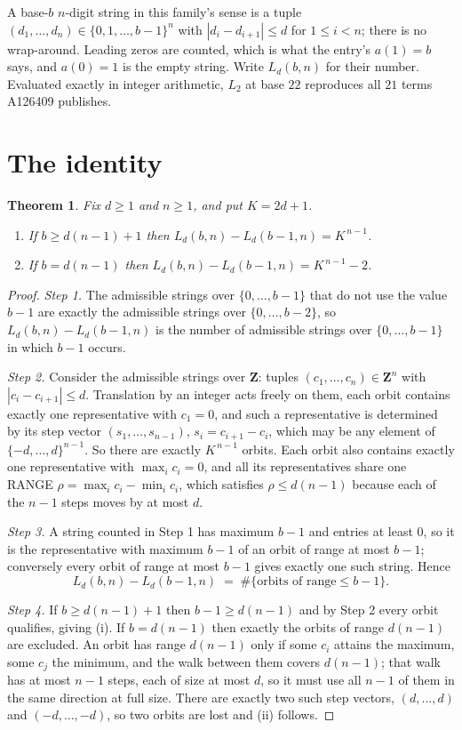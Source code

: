 \documentclass[11pt,a4paper]{article}
\theoremstyle{plain}
\newtheorem{theorem}{Theorem}
\theoremstyle{definition}
\begin{document}
A base-$b$ $n$-digit string in this family's sense is a tuple
$(d_1,\dots,d_n)\in\{0,1,\dots,b-1\}^{n}$ with $|d_i-d_{i+1}|\le d$ for $1\le i<n$; there
is no wrap-around. Leading zeros are counted, which is what the entry's $a(1)=b$ says, and
$a(0)=1$ is the empty string. Write $L_d(b,n)$ for their number. Evaluated exactly in integer
arithmetic, $L_{2}$ at base $22$ reproduces all $21$ terms A126409 publishes.

\section{The identity}

\begin{theorem}
Fix $d\ge1$ and $n\ge1$, and put $K=2d+1$.
\begin{enumerate}
\item[(i)] If $b\ge d(n-1)+1$ then $L_d(b,n)-L_d(b-1,n)=K^{\,n-1}$.
\item[(ii)] If $b=d(n-1)$ then $L_d(b,n)-L_d(b-1,n)=K^{\,n-1}-2$.
\end{enumerate}
\end{theorem}

\begin{proof}
\emph{Step 1.} The admissible strings over $\{0,\dots,b-1\}$ that do not use the value $b-1$
are exactly the admissible strings over $\{0,\dots,b-2\}$, so $L_d(b,n)-L_d(b-1,n)$ is the
number of admissible strings over $\{0,\dots,b-1\}$ in which $b-1$ occurs.

\emph{Step 2.} Consider the admissible strings over $\mathbf{Z}$: tuples
$(c_1,\dots,c_n)\in\mathbf{Z}^{n}$ with $|c_i-c_{i+1}|\le d$. Translation by an integer acts
freely on them, each orbit contains exactly one representative with $c_1=0$, and such a
representative is determined by its step vector $(s_1,\dots,s_{n-1})$, $s_i=c_{i+1}-c_i$,
which may be any element of $\{-d,\dots,d\}^{n-1}$. So there are exactly $K^{\,n-1}$ orbits.
Each orbit also contains exactly one representative with $\max_i c_i=0$, and all its
representatives share one RANGE $\rho=\max_ic_i-\min_ic_i$, which satisfies
$\rho\le d(n-1)$ because each of the $n-1$ steps moves by at most $d$.

\emph{Step 3.} A string counted in Step 1 has maximum $b-1$ and entries at least $0$, so it is
the representative with maximum $b-1$ of an orbit of range at most $b-1$; conversely every orbit
of range at most $b-1$ gives exactly one such string. Hence
\[
L_d(b,n)-L_d(b-1,n)\;=\;\#\{\text{orbits of range}\le b-1\} .
\]

\emph{Step 4.} If $b\ge d(n-1)+1$ then $b-1\ge d(n-1)$ and by Step 2 every orbit qualifies,
giving (i). If $b=d(n-1)$ then exactly the orbits of range $d(n-1)$ are excluded. An orbit has
range $d(n-1)$ only if some $c_i$ attains the maximum, some $c_j$ the minimum, and the walk
between them covers $d(n-1)$; that walk has at most $n-1$ steps, each of size at most $d$, so it
must use all $n-1$ of them in the same direction at full size. There are exactly two such step
vectors, $(d,\dots,d)$ and $(-d,\dots,-d)$, so two orbits are lost and (ii) follows.
\end{proof}
\end{document}

